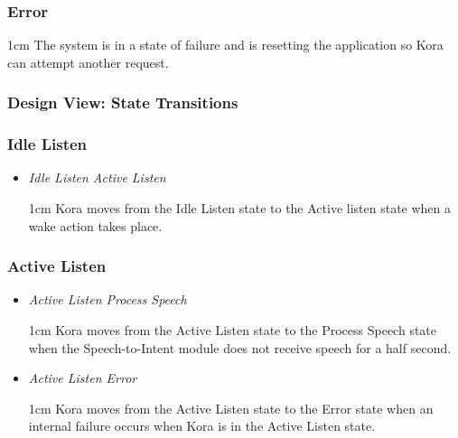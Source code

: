 \documentclass[onecolumn, draftclsnofoot,10pt, compsoc]{IEEEtran}
\def \botname{Kora\xspace}
\newenvironment{indentItem}[1][1cm]{\begin{adjustwidth}{#1}{}}{\end{adjustwidth}}
\begin{document}
	\subsubsection{Error}
	\begin{indentItem}
		The system is in a state of failure and is resetting the application so \botname can attempt another request.
	\end{indentItem}


	\subsubsection{Design View: State Transitions}
	\subsubsection{Idle Listen}
	\begin{itemize}
		\item \textit{Idle Listen \textrightarrow{}  Active Listen}
		\begin{indentItem}
			\botname moves from the Idle Listen state to the Active listen state when a wake action takes place.
		\end{indentItem}
	\end{itemize}

	\subsubsection{Active Listen}
	\begin{itemize}
		\item \textit{Active Listen \textrightarrow{}  Process Speech}
		\begin{indentItem}
			\botname moves from the Active Listen state to the Process Speech state when the Speech-to-Intent module does not receive speech for a half second.
		\end{indentItem}
		\item \textit{Active Listen \textrightarrow{}  Error}
		\begin{indentItem}
			\botname moves from the Active Listen state to the Error state when an internal failure occurs when \botname is in the Active Listen state.
		\end{indentItem}
	\end{itemize}
\end{document}
